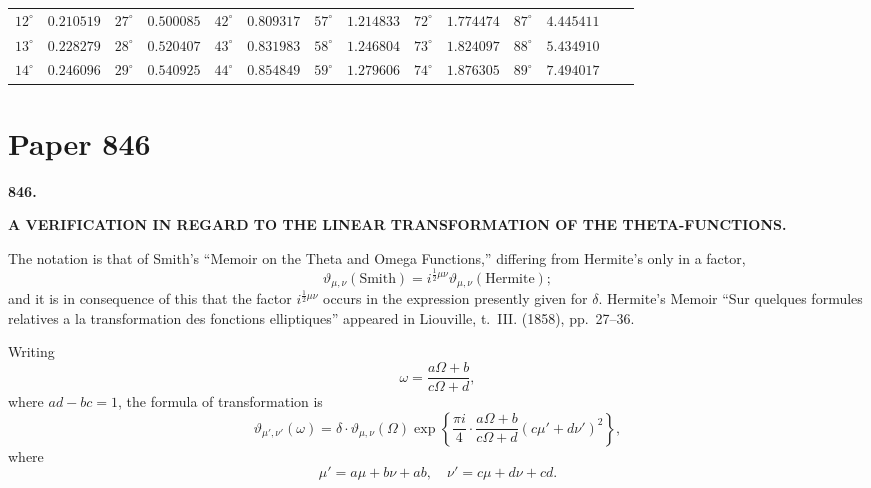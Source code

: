 \documentclass[11pt,a4paper]{book}
\begin{document}
\begin{center}
\begin{tabular}{r|r|r|r|r|r|r|r|r|r|r|r|r|r}
$12^\circ$ & $0.210519$ & $27^\circ$ & $0.500085$ & $42^\circ$ & $0.809317$ & $57^\circ$ & $1.214833$ & $72^\circ$ & $1.774474$ & $87^\circ$ & $4.445411$ & & \\
$13^\circ$ & $0.228279$ & $28^\circ$ & $0.520407$ & $43^\circ$ & $0.831983$ & $58^\circ$ & $1.246804$ & $73^\circ$ & $1.824097$ & $88^\circ$ & $5.434910$ & & \\
$14^\circ$ & $0.246096$ & $29^\circ$ & $0.540925$ & $44^\circ$ & $0.854849$ & $59^\circ$ & $1.279606$ & $74^\circ$ & $1.876305$ & $89^\circ$ & $7.494017$ & & \\
\hline
\end{tabular}
\end{center}

\newpage

\section{Paper 846}

\begin{center}
\large\textbf{846.}

\Large\textbf{A VERIFICATION IN REGARD TO THE LINEAR TRANSFORMATION OF THE THETA-FUNCTIONS.}

\end{center}

\bigskip

The notation is that of Smith's ``Memoir on the Theta and Omega Functions,'' differing from Hermite's only in a factor,
\[
\vartheta_{\mu,\nu}(\text{Smith}) = i^{\frac{1}{2}\mu\nu}\vartheta_{\mu,\nu}(\text{Hermite});
\]
and it is in consequence of this that the factor $i^{\frac{1}{2}\mu\nu}$ occurs in the expression presently given for $\delta$. Hermite's Memoir ``Sur quelques formules relatives a la transformation des fonctions elliptiques'' appeared in Liouville, t.~III. (1858), pp.~27--36.

Writing
\[
\omega = \frac{a\Omega + b}{c\Omega + d},
\]
where $ad - bc = 1$, the formula of transformation is
\[
\vartheta_{\mu',\nu'}(\omega) = \delta \cdot \vartheta_{\mu,\nu}(\Omega) \exp\left\{\frac{\pi i}{4}\cdot\frac{a\Omega + b}{c\Omega + d}(c\mu' + d\nu')^2\right\},
\]
where
\[
\mu' = a\mu + b\nu + ab, \quad \nu' = c\mu + d\nu + cd.
\]
\end{document}
